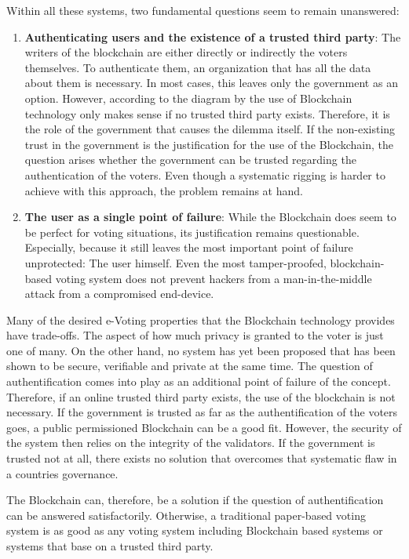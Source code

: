 Within all these systems, two fundamental questions seem to remain unanswered:
\begin{enumerate}
    \item \textbf{Authenticating users and the existence of a trusted third party}:    The writers of the blockchain are either directly or indirectly the voters themselves. To authenticate them, an organization that has all the data about them is necessary. In most cases, this leaves only the government as an option. However, according to the diagram by  \citeauthor{Wust2017} the use of Blockchain technology only makes sense if no trusted third party exists. Therefore, it is the role of the government that causes the dilemma itself. If the non-existing trust in the government is the justification for the use of the Blockchain, the question arises whether the government can be trusted regarding the authentication of the voters. Even though a systematic rigging is harder to achieve with this approach, the problem remains at hand.
    \item \textbf{The user as a single point of failure}: While the Blockchain does seem to be perfect for voting situations, its justification remains questionable. Especially, because it still leaves the most important point of failure unprotected: The user himself. Even the most tamper-proofed, blockchain-based voting system does not prevent hackers from a man-in-the-middle attack from a compromised end-device.
\end{enumerate}

Many of the desired e-Voting properties that the Blockchain technology provides have trade-offs. The aspect of how much privacy is granted to the voter is just one of many. On the other hand, no system has yet been proposed that has been shown to be secure, verifiable and private at the same time. The question of authentification comes into play as an additional point of failure of the concept.
Therefore, if an online trusted third party exists, the use of the blockchain is not necessary. If the government is trusted as far as the authentification of the voters goes, a public permissioned Blockchain can be a good fit. However, the security of the system then relies on the integrity of the validators.
If the government is trusted not at all, there exists no solution that overcomes that systematic flaw in a countries governance.

The Blockchain can, therefore, be a solution if the question of authentification can be answered satisfactorily. Otherwise, a traditional paper-based voting system is as good as any voting system including Blockchain based systems or systems that base on a trusted third party.

